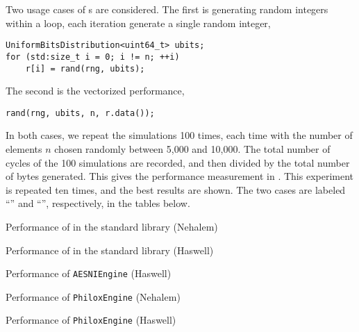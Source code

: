 Two usage cases of \rng{}s are considered. The first is generating random
integers within a loop, each iteration generate a single random integer,
\begin{verbatim}
UniformBitsDistribution<uint64_t> ubits;
for (std:size_t i = 0; i != n; ++i)
    r[i] = rand(rng, ubits);
\end{verbatim}
The second is the vectorized performance,
\begin{verbatim}
rand(rng, ubits, n, r.data());
\end{verbatim}
In both cases, we repeat the simulations 100 times, each time with the number
of elements $n$ chosen randomly between 5,000 and 10,000. The total number of
cycles of the 100 simulations are recorded, and then divided by the total
number of bytes generated. This gives the performance measurement in \cpb. This
experiment is repeated ten times, and the best results are shown. The two cases
are labeled ``\single'' and ``\batch'', respectively, in the tables below.

\begin{table}
  \caption{Performance of \rng in the standard library (Nehalem)}
  \label{tab:Performance of RNG in the standard library RNG (Nehalem)}
\end{table}

\begin{table}
  \caption{Performance of \rng in the standard library (Haswell)}
  \label{tab:Performance of RNG in the standard library RNG (Haswell)}
\end{table}

\begin{table}
  \caption{Performance of \protect\texttt{AESNIEngine} (Haswell)}
  \label{tab:Performance of AESNIEngine (Haswell)}
\end{table}

\begin{table}
  \caption{Performance of \protect\texttt{PhiloxEngine} (Nehalem)}
  \label{tab:Performance of PhiloxEngine (Nehalem)}
\end{table}

\begin{table}
  \caption{Performance of \protect\texttt{PhiloxEngine} (Haswell)}
  \label{tab:Performance of PhiloxEngine (Haswell)}
\end{table}

